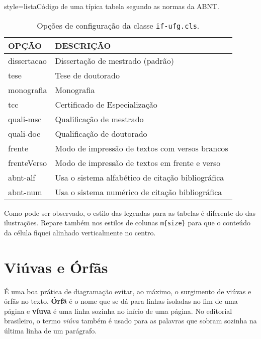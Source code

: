 \begin{codigo}{style=lista}{Código de uma típica tabela segundo as normas da ABNT.}
\begin{table}[!h]
\centering
\caption{Opções de configuração da classe \texttt{if-ufg.cls}.}
\label{tab:opcoes_classe}
\begin{tabular}{m{4cm}m{9cm}}
\hline
\textbf{OPÇÃO} & \textbf{DESCRIÇÃO} \\ \hline
dissertacao & Dissertação de mestrado (padrão) \\ \hline
tese & Tese de doutorado \\ \hline
monografia & Monografia \\ \hline
tcc & Certificado de Especialização \\ \hline
quali-msc & Qualificação de mestrado \\ \hline
quali-doc & Qualificação de doutorado \\ \hline
frente & Modo de impressão de textos com versos brancos \\ \hline
frenteVerso & Modo de impressão de textos em frente e verso \\ \hline
abnt-alf & Usa o sistema alfabético de citação bibliográfica \\ \hline
abnt-num & Usa o sistema numérico de citação bibliográfica \\ \hline
\end{tabular}
\end{table}
\end{codigo}

Como pode ser observado, o estilo das legendas para as tabelas é diferente do das ilustrações. Repare também nos estilos de colunas \Verb+m{size}+ para que o conteúdo da célula fiquei alinhado verticalmente no centro.

\section{Viúvas e Órfãs}

É uma boa prática de diagramação evitar, ao máximo, o surgimento de viúvas e órfãs no texto. \textbf{Órfã} é o nome que se dá para linhas isoladas no fim de uma página e \textbf{víuva} é uma linha sozinha no início de uma página. No editorial brasileiro, o termo \emph{viúva} também é usado para as palavras que sobram sozinha na última linha de um parágrafo.

